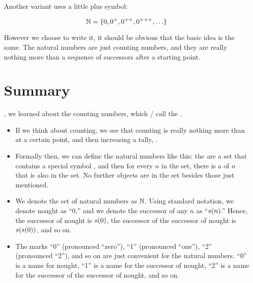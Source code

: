 \documentclass[../../../main.tex]{subfiles}
\begin{document}
Another variant uses a little plus symbol: 

\begin{equation*}
  \Nats/ = \{ 0, 0^{+}, 0^{++}, 0^{+++}, \ldots \}
\end{equation*}

However we choose to write it, it should be obvious that the basic idea is the same. The natural numbers are just counting numbers, and they are really nothing more than a sequence of successors after a starting point.


\section{Summary}

, we learned about the counting numbers, which \mathers / call the .

\begin{itemize}

  \item If we think about counting, we see that counting is really nothing more than  at a certain point, and then increasing a tally, .
  
  \item Formally then, we can define the natural numbers like this: the  are a set that contains a special symbol , and then for every $n$ in the set, there is a  of $n$ that is also in the set. No further objects are in the set besides those just mentioned. 
  
  \item We denote the set of natural numbers as $\Nats/$. Using standard notation, we denote nought as ``$0$,'' and we denote the successor of any $n$ as ``$s(n)$.'' Hence, the successor of nought is $s(0)$, the successor of the successor of nought is $s(s(0))$, and so on.
  
  \item The marks ``0'' (pronounced ``zero''), ``1'' (pronounced ``one''), ``2'' (pronounced ``2''), and so on are just convenient  for the natural numbers. ``0'' is a name for nought, ``1'' is a name for the successor of nought, ``2'' is a name for the successor of the successor of nought, and so on.

\end{itemize}
\end{document}
